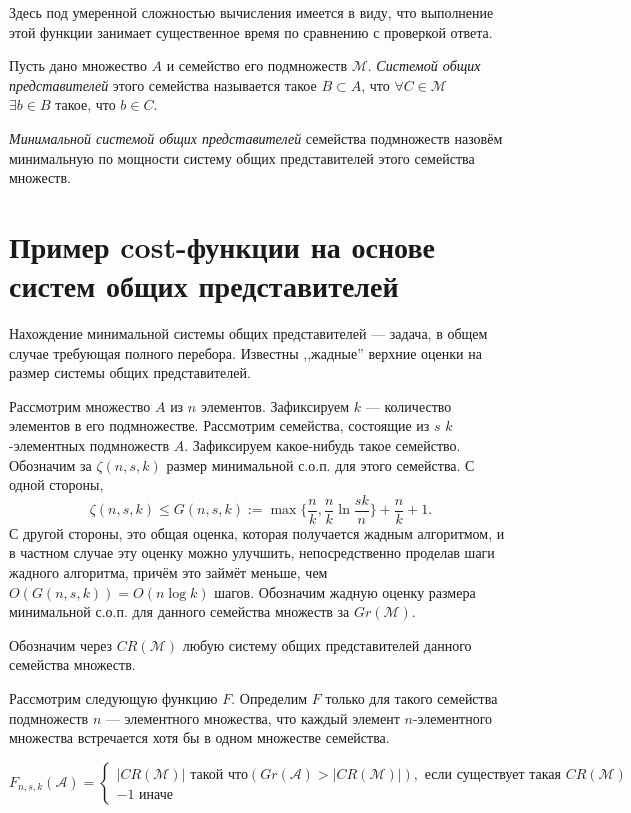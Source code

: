 \documentclass{article}
\begin{document}
Здесь под умеренной сложностью вычисления имеется в виду, что выполнение этой функции занимает существенное время по сравнению с проверкой ответа.

Пусть дано множество $A$ и семейство его подмножеств $\mathcal{M}$. \textit{Системой общих представителей} этого семейства называется такое $B \subset A$, что $\forall C \in \mathcal{M}$ $\exists b \in B \text{ такое, что } b \in C$. 

\textit{Минимальной системой общих представителей} семейства подмножеств назовём минимальную по мощности систему общих представителей этого семейства множеств.

\section{Пример cost-функции на основе систем общих представителей}

    Нахождение минимальной системы общих представителей --- задача, в общем случае требующая полного перебора. Известны ,,жадные'' верхние оценки на размер системы общих представителей. \cite{raigor}

    Рассмотрим множество $A$ из $n$ элементов. Зафиксируем $k$ --- количество элементов в его подмножестве. Рассмотрим семейства, состоящие из $s$ $k$-элементных подмножеств $A$. Зафиксируем какое-нибудь такое семейство.
    Обозначим за $\zeta(n, s, k)$ размер минимальной с.о.п. для этого семейства. С одной стороны, $$\zeta(n, s, k) \leq G(n, s, k) := \max\{\frac{n}{k}, \frac{n}{k} \ln \frac{sk}{n}\} + \frac{n}{k} + 1.$$ С другой стороны, это общая оценка, которая получается жадным алгоритмом, и в частном случае эту оценку можно улучшить, непосредственно проделав шаги жадного алгоритма, причём это займёт меньше, чем $O(G(n, s, k)) = O(n \log k)$ шагов. Обозначим жадную оценку размера минимальной с.о.п. для данного семейства множеств за $Gr(\mathcal{M})$.

    Обозначим через $CR(\mathcal{M})$ любую систему общих представителей данного семейства множеств.

    Рассмотрим следующую функцию $F$. Определим $F$ только для такого семейства подмножеств $n$ --- элементного множества, что каждый элемент $n$-элементного множества встречается хотя бы в одном множестве семейства.

\begin{equation*}
    F_{n,s,k}(\mathcal{A}) = 
     \begin{cases}
       |CR(\mathcal{M})| \text{ такой что} (Gr(\mathcal{A}) > |CR(\mathcal{M})|), \text{ если существует такая } CR(\mathcal{M}) \\
       -1 \text{ иначе}
    \end{cases}
\end{equation*}
    
\end{document}
